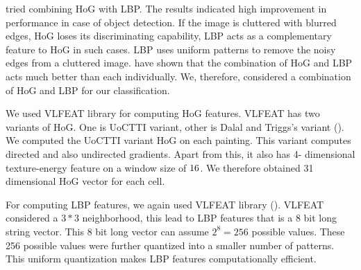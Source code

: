 \citet*{WangHOG} tried combining HoG with LBP. The results indicated 
high improvement in performance in case of object detection. If the image is cluttered with 
blurred edges,  HoG loses its discriminating capability,  LBP acts as a complementary feature to HoG in such 
cases. LBP uses uniform patterns to remove the noisy edges from a 
cluttered image. \citet*{santana} have shown 
that the combination of HoG and LBP acts much better than each 
individually. We, therefore, considered a combination of HoG and LBP 
for our classification. 

We used VLFEAT \citet*{vlfeat} library for computing HoG features. 
VLFEAT has two variants of HoG. One is UoCTTI variant, other is 
Dalal and Triggs's variant (\citet*{HOG}). We computed the UoCTTI 
variant HoG on each painting. This variant computes directed and 
also undirected gradients. Apart from this, it also has 4-
dimensional texture-energy feature on a window size of $16 \time 16$. 
We therefore obtained 31 dimensional HoG vector for each cell.

For computing LBP features, we again used VLFEAT library (\citet*{vlfeat}).  
VLFEAT considered a $3*3$ neighborhood, this lead to LBP features that is 
a 8 bit long string vector. This 8 bit long vector can assume $2^8 = 256$ 
possible values. These 256 possible values were further quantized into a smaller number of patterns. This uniform quantization makes LBP features computationally efficient.

